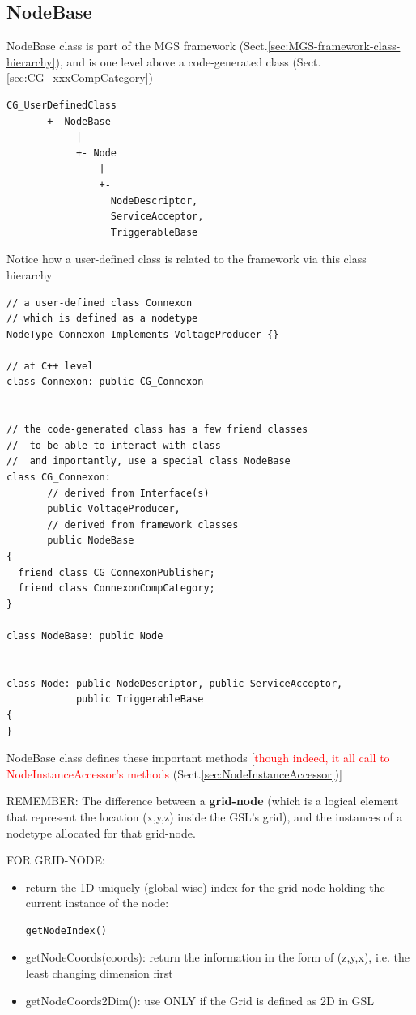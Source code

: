 \subsection{NodeBase}
\label{sec:NodeBase}


NodeBase class is part of the MGS framework
(Sect.\ref{sec:MGS-framework-class-hierarchy}), and is one level above a code-generated class (Sect.\ref{sec:CG_xxxCompCategory})
\begin{verbatim}
CG_UserDefinedClass
       +- NodeBase
            |
            +- Node
                |
                +-         
                  NodeDescriptor, 
                  ServiceAcceptor,
                  TriggerableBase
\end{verbatim}

Notice how a user-defined class is related to the framework via this class
hierarchy

\begin{verbatim}
// a user-defined class Connexon
// which is defined as a nodetype
NodeType Connexon Implements VoltageProducer {}

// at C++ level
class Connexon: public CG_Connexon


// the code-generated class has a few friend classes
//  to be able to interact with class
//  and importantly, use a special class NodeBase
class CG_Connexon: 
       // derived from Interface(s)
       public VoltageProducer, 
       // derived from framework classes
       public NodeBase
{
  friend class CG_ConnexonPublisher;
  friend class ConnexonCompCategory;
}

class NodeBase: public Node 


class Node: public NodeDescriptor, public ServiceAcceptor,
            public TriggerableBase
{
}
\end{verbatim}


NodeBase class defines these important methods [\textcolor{red}{though indeed, it all call
to NodeInstanceAccessor's methods} (Sect.\ref{sec:NodeInstanceAccessor})]


REMEMBER: The difference between a {\bf grid-node} (which is a logical element that
represent the location (x,y,z) inside the GSL's grid), and the instances of a
nodetype allocated for that grid-node.

FOR GRID-NODE:
\begin{itemize}

 \item return the 1D-uniquely (global-wise) index for the grid-node holding the current
  instance of the node:
  
\begin{verbatim}
getNodeIndex()
\end{verbatim}


  \item getNodeCoords(coords): return the information in the form of (z,y,x),
  i.e. the least changing dimension first
  
  \item getNodeCoords2Dim(): use ONLY if the Grid is defined as 2D in GSL
  
\end{itemize}

